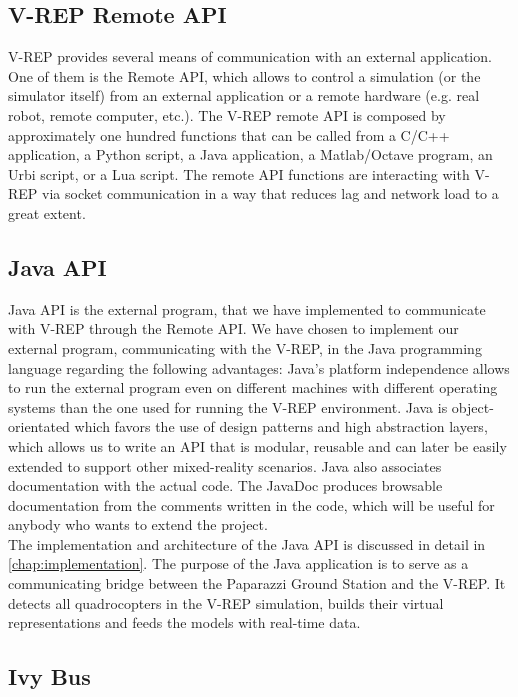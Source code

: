 \subsection{V-REP Remote API}
    V-REP provides several means of communication with an external application. One of them is the Remote API, which allows to control a simulation (or the simulator itself) from an external application or a remote hardware (e.g. real robot, remote computer, etc.).
     The V-REP remote API is composed by approximately one hundred functions that can be called from a C/C++ application, a Python script, a Java application, a Matlab/Octave program, an Urbi script, or a Lua script. 
     The remote API functions are interacting with V-REP via socket communication in a way that reduces lag and network load to a great extent.
    
\subsection{Java API}
    Java API is the external program, that we have implemented to communicate with V-REP through the Remote API.
    We have chosen to implement our external program, communicating with the V-REP, in the Java programming language regarding the following advantages: Java's platform independence allows to run the external program even on different machines with different operating systems than the one used for running the V-REP environment.  
    Java is object-orientated which favors the use of design patterns and high abstraction layers, which allows us to write an API that is modular, reusable and can later be easily extended to support other mixed-reality scenarios. 
    Java also associates documentation with the actual code. 
    The JavaDoc produces browsable documentation from the comments written in the code, which will be useful for anybody who wants to extend the project.\\
    
    The implementation and architecture of the Java API is discussed in detail in \ref{chap:implementation}. 
    The purpose of the Java application is to serve as a communicating bridge between the Paparazzi Ground Station and the V-REP. 
    It detects all quadrocopters in the V-REP simulation, builds their virtual representations and feeds the models with real-time data.
    
\subsection{Ivy Bus}

